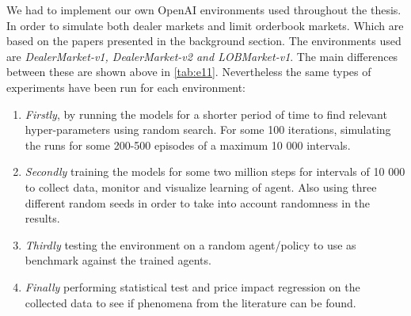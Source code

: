 \documentclass{kththesis}
\theoremstyle{definition}
\begin{document}
We had to implement our own OpenAI environments used throughout the thesis. In order to simulate both dealer markets and limit orderbook markets. Which are based on the papers presented in the background section. 
\newline
\newline
The environments used are \textit{ DealerMarket-v1, DealerMarket-v2 and LOBMarket-v1}. The main differences between these are shown above in \autoref{tab:e11}.
Nevertheless the same types of experiments have been run for each environment:

\begin{enumerate}
    \item \textit{Firstly}, by running the models for a shorter period of time to find relevant hyper-parameters using random search. For some 100 iterations, simulating the runs for some 200-500 episodes of a maximum 10 000 intervals.
    
    \item \textit{Secondly} training the models for some two million steps for intervals of 10 000 to collect data, monitor and visualize learning of agent. Also using three different random seeds in order to take into account randomness in the results. 
    
    \item\textit{Thirdly} testing the environment on a random agent/policy to use as benchmark against the trained agents.
    
    \item   \textit{Finally} performing statistical test and price impact regression on the collected data to see if phenomena from the literature can be found.
\end{enumerate}

\newpage
\end{document}
